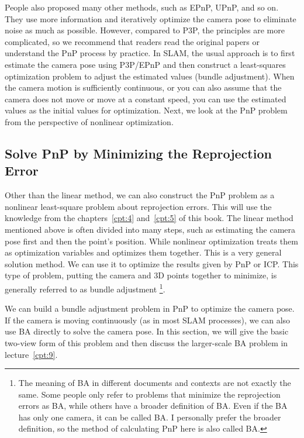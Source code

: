 People also proposed many other methods, such as EPnP, UPnP, and so on. They use more information and iteratively optimize the camera pose to eliminate noise as much as possible. However, compared to P3P, the principles are more complicated, so we recommend that readers read the original papers or understand the PnP process by practice. In SLAM, the usual approach is to first estimate the camera pose using P3P/EPnP and then construct a least-squares optimization problem to adjust the estimated values (bundle adjustment). When the camera motion is sufficiently continuous, or you can also assume that the camera does not move or move at a constant speed, you can use the estimated values as the initial values for optimization. Next, we look at the PnP problem from the perspective of nonlinear optimization.

\subsection{Solve PnP by Minimizing the Reprojection Error}
\label{sec:BA-vo1}
Other than the linear method, we can also construct the PnP problem as a nonlinear least-square problem about reprojection errors. This will use the knowledge from the chapters~\ref{cpt:4} and~\ref{cpt:5} of this book. The linear method mentioned above is often divided into many steps, such as estimating the camera pose first and then the point's position. While nonlinear optimization treats them as optimization variables and optimizes them together. This is a very general solution method. We can use it to optimize the results given by PnP or ICP. This type of problem, putting the camera and 3D points together to minimize, is generally referred to as bundle adjustment \footnote{The meaning of BA in different documents and contexts are not exactly the same. Some people only refer to problems that minimize the reprojection errors as BA, while others have a broader definition of BA. Even if the BA has only one camera, it can be called BA. I personally prefer the broader definition, so the method of calculating PnP here is also called BA.}.

We can build a bundle adjustment problem in PnP to optimize the camera pose. If the camera is moving continuously (as in most SLAM processes), we can also use BA directly to solve the camera pose. In this section, we will give the basic two-view form of this problem and then discuss the larger-scale BA problem in lecture~\ref{cpt:9}.


